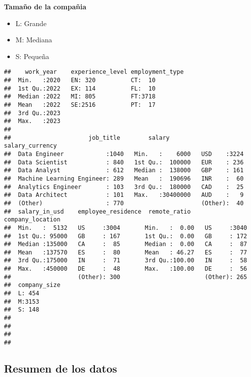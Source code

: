\documentclass[
]{article}
\providecommand{\tightlist}{%
  \setlength{\itemsep}{0pt}\setlength{\parskip}{0pt}}
\begin{document}
\textbf{Tamaño de la compañia}

\begin{itemize}
\tightlist
\item
  L: Grande
\item
  M: Mediana
\item
  S: Pequeña
\end{itemize}

\begin{verbatim}
##    work_year    experience_level employment_type
##  Min.   :2020   EN: 320          CT:  10        
##  1st Qu.:2022   EX: 114          FL:  10        
##  Median :2022   MI: 805          FT:3718        
##  Mean   :2022   SE:2516          PT:  17        
##  3rd Qu.:2023                                   
##  Max.   :2023                                   
##                                                 
##                      job_title        salary         salary_currency
##  Data Engineer            :1040   Min.   :    6000   USD    :3224   
##  Data Scientist           : 840   1st Qu.:  100000   EUR    : 236   
##  Data Analyst             : 612   Median :  138000   GBP    : 161   
##  Machine Learning Engineer: 289   Mean   :  190696   INR    :  60   
##  Analytics Engineer       : 103   3rd Qu.:  180000   CAD    :  25   
##  Data Architect           : 101   Max.   :30400000   AUD    :   9   
##  (Other)                  : 770                      (Other):  40   
##  salary_in_usd    employee_residence  remote_ratio    company_location
##  Min.   :  5132   US     :3004       Min.   :  0.00   US     :3040    
##  1st Qu.: 95000   GB     : 167       1st Qu.:  0.00   GB     : 172    
##  Median :135000   CA     :  85       Median :  0.00   CA     :  87    
##  Mean   :137570   ES     :  80       Mean   : 46.27   ES     :  77    
##  3rd Qu.:175000   IN     :  71       3rd Qu.:100.00   IN     :  58    
##  Max.   :450000   DE     :  48       Max.   :100.00   DE     :  56    
##                   (Other): 300                        (Other): 265    
##  company_size
##  L: 454      
##  M:3153      
##  S: 148      
##              
##              
##              
## 
\end{verbatim}

\hypertarget{resumen-de-los-datos}{%
\subsection{\texorpdfstring{\textbf{Resumen de los
datos}}{Resumen de los datos}}\label{resumen-de-los-datos}}
\end{document}
